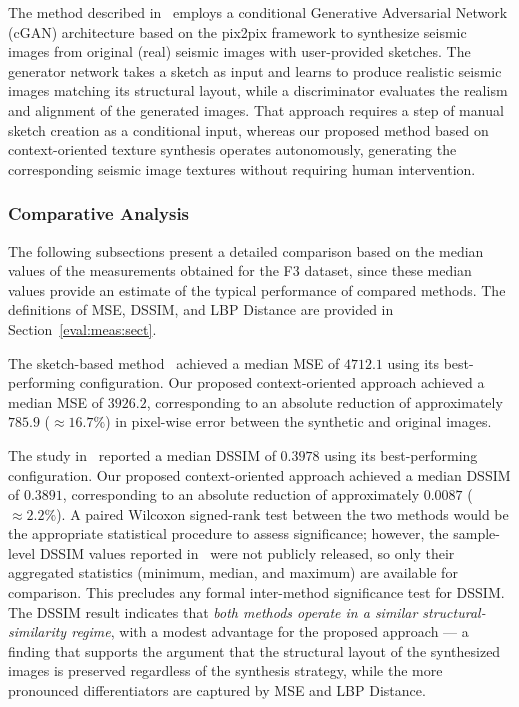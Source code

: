 \documentclass{ieeeaccess}
\begin{document}
The method described in~\cite{Ferreira2020} employs a conditional Generative Adversarial Network (cGAN) architecture based on the pix2pix framework to synthesize seismic images from original (real) seismic images with user-provided sketches. The generator network takes a sketch as input and learns to produce realistic seismic images matching its structural layout, while a discriminator evaluates the realism and alignment of the generated images. That approach requires a step of manual sketch creation as a conditional input, whereas our proposed method based on context-oriented texture synthesis operates autonomously, generating the corresponding seismic image textures without requiring human intervention.


\subsubsection{Comparative Analysis}

The following subsections present a detailed comparison based on the median values of the measurements obtained for the F3 dataset, since these median values provide an estimate of the typical performance of compared methods. The  definitions of MSE, DSSIM, and LBP Distance are provided in Section~\ref{eval:meas:sect}.

The sketch-based method~\cite{Ferreira2020} achieved a median MSE of $4712.1$ using its best-performing configuration. Our proposed context-oriented approach achieved a median MSE of $3926.2$, corresponding to an absolute reduction of approximately $785.9$ ($\approx 16.7\%$) in pixel-wise error between the synthetic and original images.

The study in~\cite{Ferreira2020} reported a median DSSIM of $0.3978$ using its best-performing configuration. Our proposed context-oriented approach achieved a median DSSIM of $0.3891$, corresponding to an absolute reduction of approximately $0.0087$ ($\approx 2.2\%$). A paired Wilcoxon signed-rank test between the two methods would be the appropriate statistical procedure to assess significance; however, the sample-level DSSIM values reported in~\cite{Ferreira2020} were not publicly released, so only their aggregated statistics (minimum, median, and maximum) are available for comparison. This precludes any formal inter-method significance test for DSSIM. The DSSIM result indicates that \emph{both methods operate in a similar structural-similarity regime}, with a modest advantage for the proposed approach --- a finding that supports the argument that the structural layout of the synthesized images is preserved regardless of the synthesis strategy, while the more pronounced differentiators are captured by MSE and LBP Distance.
\end{document}
